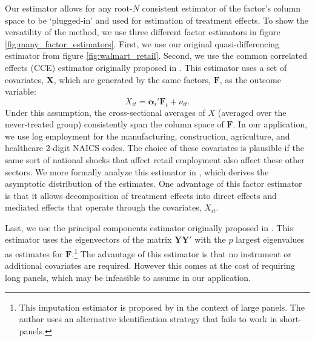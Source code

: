 \documentclass[12pt]{article}
\begin{document}
Our estimator allows for any root-$N$ consistent estimator of the factor's column space to be `plugged-in' and used for estimation of treatment effects. To show the versatility of the method, we use three different factor estimators in figure \ref{fig:many_factor_estimators}. First, we use our original quasi-differencing estimator from figure \ref{fig:walmart_retail}. Second, we use the common correlated effects (CCE) estimator originally proposed in \citet{pesaran2006estimation}. This estimator uses a set of covariates, $\bm X$, which are generated by the same factors, $\bm{F}$, as the outcome variable:
\begin{equation}
  X_{it} = \bm\alpha_i' \bm{F}_t + \nu_{it}.
\end{equation}
Under this assumption, the cross-sectional averages of $X$ (averaged over the never-treated group) consistently span the column space of $\bm{F}$.  In our application, we use log employment for the manufacturing, construction, agriculture, and healthcare 2-digit NAICS codes. The choice of these covariates is plausible if the same sort of national shocks that affect retail employment also affect these other sectors. We more formally analyze this estimator in \citet{Brown_Butts_Westerlund_2023}, which derives the asymptotic distribution of the estimates. One advantage of this factor estimator is that it allows decomposition of treatment effects into direct effects and mediated effects that operate through the covariates, $X_{it}$.

Last, we use the principal components estimator originally proposed in \citet{Bai_2009}. This estimator uses the eigenvectors  of the matrix $\bm Y \bm Y'$ with the $p$ largest eigenvalues as estimates for $\bm{F}$.\footnote{This imputation estimator is proposed by \citet{Xu_2017} in the context of large panels. The author uses an alternative identification strategy that fails to work in short-panels.} The advantage of this estimator is that no instrument or additional covariates are required. However this comes at the cost of requiring long panels, which may be infeasible to assume in our application.
\end{document}
